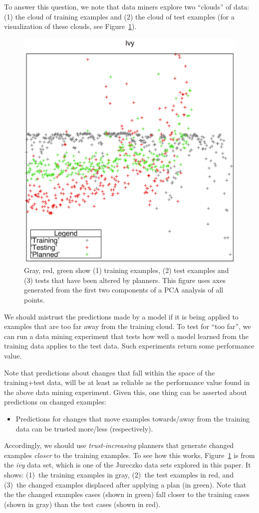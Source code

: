\documentclass{sig-alternate}
\newcommand{\bi}{\begin{itemize}}
\newcommand{\ei}{\end{itemize}}
\newcommand{\fig}[1]{Figure~\ref{fig:#1}}
\begin{document}
To answer this question, we note
that data miners explore two  ``clouds'' of data: (1) the cloud of training examples and (2) the  cloud   of test examples
(for a visualization of these clouds, see \fig{howxy}).
\begin{figure}[!t]
  \includegraphics[width=\linewidth]{figs/twodee.eps} 
\caption{Gray, red, green show (1) training examples, (2) test examples and 
  (3) tests that have been altered by planners.
  This figure uses axes generated from the first two components of a PCA analysis of all points. 
}\label{fig:howxy}
\end{figure}
We should mistrust the predictions made by a  model   if it is being applied to examples  that are
too far away from the
training cloud.
To test for ``too far'', we can run a data mining experiment that tests how well
a model learned from the training data applies to the test data. Such experiments return some performance value.

Note that predictions  about changes that  fall within the space of the training+test data, will be at least
as reliable as the performance value found in the above data mining experiment.
Given this, one thing  can be asserted about predictions on changed examples:
\bi
\item Predictions for changes that move examples towards/away from the training data can be trusted more/less (respectively).
\ei  
Accordingly, we should use  {\em trust-increasing} planners that generate changed examples {\em closer} to the
training examples.  To see how this works, 
 \fig{howxy} is from the {\em ivy} data
set, which is one of the Jureczko data sets explored in this paper. It shows: (1)~the training examples in gray, (2)~the test examples in red, and (3)~the
changed  examples displaced after applying a plan (in green).
 Note that the  the   changed examples
cases  (shown in green)  fall closer to the training cases (shown in gray) than
the test cases (shown in red). 
\end{document}

